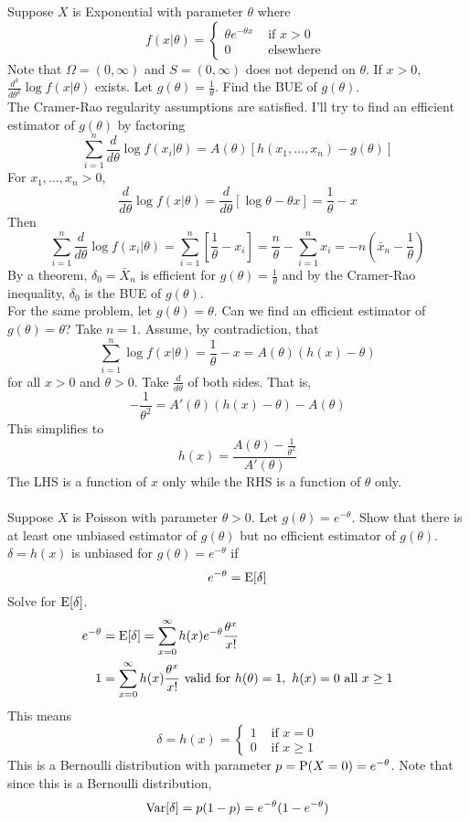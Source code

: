 \documentclass[12pt]{article}
\begin{document}
Suppose $X$ is Exponential with parameter $\theta$ where $$f(x|\theta) = \begin{cases} \theta e^{-\theta x} &\text{ if } x > 0 \\ 0 &\text{ elsewhere } \end{cases} $$ Note that $\Omega = (0,\infty)$ and $S = (0,\infty)$ does not depend on $\theta$. If $x > 0$, $\frac{d^k}{d\theta^k} \log f(x|\theta)$ exists. Let $g(\theta) = \frac{1}{\theta}$. Find the BUE of $g(\theta)$. \\ The Cramer-Rao regularity assumptions are satisfied. I'll try to find an efficient estimator of $g(\theta)$ by factoring $$ \sum_{i=1}^n \frac{d}{d\theta} \log f(x_i|\theta) = A(\theta)[h(x_1,\dots,x_n) - g(\theta)] $$ 
For $x_1,\dots,x_n > 0$, $$ \frac{d}{d\theta} \log f(x|\theta) = \frac{d}{d\theta} [\log \theta - \theta x] = \frac{1}{\theta} - x $$ 
Then $$ \sum_{i=1}^n \frac{d}{d\theta} \log f(x_i | \theta) = \sum_{i=1}^n [\frac{1}{\theta} - x_i] = \frac{n}{\theta} - \sum_{i=1}^n x_i = -n(\bar{x}_n - \frac{1}{\theta}) $$ By a theorem, $\delta_0 = \bar{X}_n$ is efficient for $g(\theta) = \frac{1}{\theta}$ and by the Cramer-Rao inequality, $\delta_0$ is the BUE of $g(\theta)$. \\
For the same problem, let $g(\theta) = \theta$. Can we find an efficient estimator of $g(\theta) = \theta$? Take $n=1$. Assume, by contradiction, that $$ \sum_{i=1}^n \log f(x|\theta) = \frac{1}{\theta} - x = A(\theta)(h(x) - \theta)$$ for all $x > 0$ and $\theta > 0$. Take $\frac{d}{d\theta}$ of both sides. That is, $$ -\frac{1}{\theta^2} = A'(\theta)(h(x) - \theta) - A(\theta) $$ This simplifies to $$h(x) = \frac{A(\theta) - \frac{1}{\theta^2}}{A'(\theta)} $$ The LHS is a function of $x$ only while the RHS is a function of $\theta$ only. \\~\\
Suppose $X$ is Poisson with parameter $\theta > 0$. Let $g(\theta) = e^{-\theta}$. Show that there is at least one unbiased estimator of $g(\theta)$ but no efficient estimator of $g(\theta)$. \\
$\delta = h(x)$ is unbiased for $g(\theta) = e^{-\theta}$ if $$e^{-\theta} = \mathrm{E}[ \delta ] $$ 
Solve for $\mathrm{E}[ \delta ]$. $$ \begin{aligned} e^{-\theta} &= \mathrm{E}[ \delta ] = \sum_{x=0}^\infty h(x) e^{-\theta} \frac{\theta^x}{x!} \\ 1 &= \sum_{x=0}^\infty h(x) \frac{\theta^x}{x!} \text{ valid for } h(\theta) = 1,~ h(x) = 0 \text{ all } x \geq 1 \end{aligned} $$ This means $$\delta = h(x) = \begin{cases} 1 &\text{ if } x = 0 \\ 0 &\text{ if } x \geq 1 \end{cases} $$ This is a Bernoulli distribution with parameter $p = \mathrm{P}( X = 0 ) = e^{-\theta}$. Note that since this is a Bernoulli distribution, $$\mathrm{Var}[ \delta ] = p(1-p) = e^{-\theta}(1-e^{-\theta}) $$ 
\end{document}
